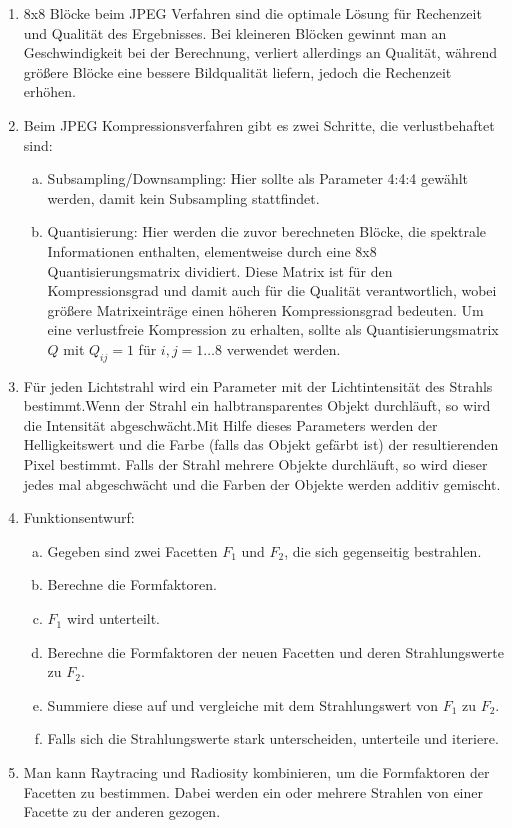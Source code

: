 \documentclass[a4paper,10pt]{scrartcl}
\begin{document}
 \begin{enumerate}[1.]
  \item 8x8 Blöcke beim JPEG Verfahren sind die optimale Lösung für Rechenzeit und Qualität des Ergebnisses. Bei kleineren Blöcken gewinnt man an Geschwindigkeit bei der Berechnung, verliert allerdings an Qualität, während größere Blöcke eine bessere Bildqualität liefern, jedoch die Rechenzeit erhöhen.

  \item Beim JPEG Kompressionsverfahren gibt es zwei Schritte, die verlustbehaftet sind:
   \begin{enumerate}[a)]
    \item Subsampling/Downsampling: Hier sollte als Parameter 4:4:4 gewählt werden, damit kein Subsampling stattfindet.
    \item Quantisierung: Hier werden die zuvor berechneten Blöcke, die spektrale Informationen enthalten, elementweise durch eine 8x8 Quantisierungsmatrix dividiert. Diese Matrix ist für den Kompressionsgrad und damit auch für die Qualität verantwortlich, wobei größere Matrixeinträge einen höheren Kompressionsgrad bedeuten. Um eine verlustfreie Kompression zu erhalten, sollte als Quantisierungsmatrix $Q$ mit $Q_{ij} = 1$ für $i,j = 1 \dots 8$ verwendet werden.
   \end{enumerate}

  \item Für jeden Lichtstrahl wird ein Parameter mit der Lichtintensität des Strahls bestimmt.Wenn der Strahl ein halbtransparentes Objekt durchläuft, so wird die Intensität abgeschwächt.Mit Hilfe dieses Parameters werden der Helligkeitswert und die Farbe (falls das Objekt gefärbt ist) der resultierenden Pixel bestimmt. Falls der Strahl mehrere Objekte durchläuft, so wird dieser jedes mal abgeschwächt und die Farben der Objekte werden additiv gemischt.

  \item Funktionsentwurf:
   \begin{enumerate}[a)]
    \item Gegeben sind zwei Facetten $F_1$ und $F_2$, die sich gegenseitig bestrahlen.
    \item Berechne die Formfaktoren.
    \item $F_1$ wird unterteilt.
    \item Berechne die Formfaktoren der neuen Facetten und deren Strahlungswerte zu $F_2$.
    \item Summiere diese auf und vergleiche mit dem Strahlungswert von $F_1$ zu $F_2$.
    \item Falls sich die Strahlungswerte stark unterscheiden, unterteile und iteriere.
   \end{enumerate}

  \item Man kann Raytracing und Radiosity kombinieren, um die Formfaktoren der Facetten zu bestimmen. Dabei werden ein oder mehrere Strahlen von einer Facette zu der anderen gezogen.


 \end{enumerate}
\end{document}
